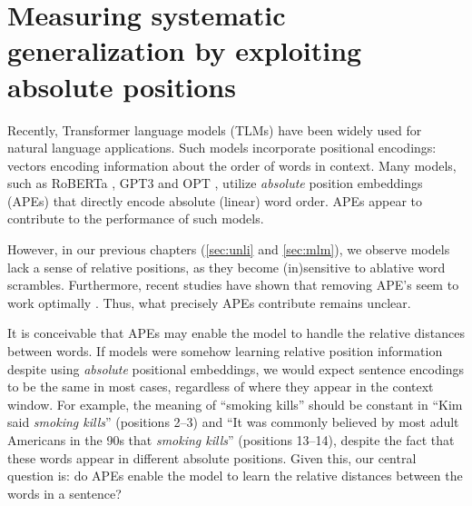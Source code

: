 \documentclass[letterpaper, 12pt]{report}
\begin{document}



\clearpage
\chapter{Measuring systematic generalization by exploiting absolute positions}
\label{sec:pos}

Recently, Transformer \citep{vaswani2017} language models (TLMs) have been widely used for natural language applications. Such models incorporate positional encodings: vectors encoding information about the order of words in context. Many models, such as RoBERTa \citep{Liu2019:RoBERTa}, GPT3 \citep{Brown2020:GPT3} and OPT \citep{Zhang2022:OPT}, utilize \textit{absolute} position embeddings (APEs) that directly encode absolute (linear) word order. APEs appear to contribute to the performance of such models.

However, in our previous chapters (\autoref{sec:unli} and \autoref{sec:mlm}), we observe models lack a sense of relative positions, as they become (in)sensitive to ablative word scrambles. Furthermore, recent studies have shown that removing APE's seem to work optimally \citep{haviv2022}. Thus, what precisely APEs contribute remains unclear.

It is conceivable that APEs may enable the model to handle the relative distances between words. %
If models were somehow learning relative position information despite using \emph{absolute} positional embeddings, we would expect sentence encodings to be the same in most cases, regardless of where they appear in the context window. For example, the meaning of ``smoking kills'' should be constant in ``Kim said \textit{smoking kills}'' (positions 2--3)  and ``It was commonly believed by most adult Americans in the 90s that \textit{smoking kills}'' (positions 13--14), despite the fact that these words appear in different absolute positions.
Given this, our central question is: do APEs enable the model to learn the relative distances between the words in a sentence?
\end{document}
